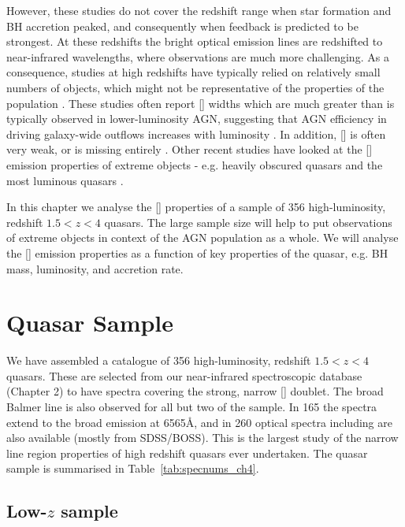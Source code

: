 However, these studies do not cover the redshift range when star formation and \ac{BH} accretion peaked, and consequently when feedback is predicted to be strongest. 
At these redshifts the bright optical emission lines are redshifted to near-infrared wavelengths, where observations are much more challenging. 
As a consequence, studies at high redshifts have typically relied on relatively small numbers of objects, which might not be representative of the properties of the population \citep[e.g.][]{netzer04,sulentic04,shen16a}.
These studies often report [] widths which are much greater than is typically observed in lower-luminosity AGN, suggesting that \ac{AGN} efficiency in driving galaxy-wide outflows increases with luminosity \citep[e.g.][]{netzer04,nesvadba08,kim13,brusa15,carniani15,perna15,bischetti16}. 
In addition, [] is often very weak, or is missing entirely \citep[e.g.][]{netzer04}. 
Other recent studies have looked at the [] emission properties of extreme objects - e.g. heavily obscured quasars \citep{zakamska16} and the most luminous quasars \citep{bischetti16}. 

In this chapter we analyse the [] properties of a sample of 356 high-luminosity, redshift $1.5 < z < 4$ quasars. 
The large sample size will help to put observations of extreme objects in context of the \ac{AGN} population as a whole.
We will analyse the [] emission properties as a function of key properties of the quasar, e.g. BH mass, luminosity, and accretion rate. 

\section{Quasar Sample}

We have assembled a catalogue of 356 high-luminosity, redshift $1.5 < z < 4$ quasars.
These are selected from our near-infrared spectroscopic database (Chapter 2) to have spectra covering the strong, narrow [] doublet. 
The broad Balmer \hb line is also observed for all but two of the sample. 
In 165 the spectra extend to the broad \ha emission at 6565\AA, and in 260 optical spectra including  are also available (mostly from \ac{SDSS}/\ac{BOSS}). 
This is the largest study of the narrow line region properties of high redshift quasars ever undertaken. 
The quasar sample is summarised in Table~\ref{tab:specnums_ch4}.

\subsection{Low-$z$ sample}

